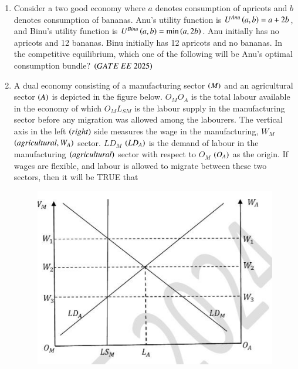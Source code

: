 \documentclass[journal,12pt,onecolumn]{IEEEtran}
\theoremstyle{remark}
\begin{document}
\begin{enumerate}
\begin{enumerate}
\end{enumerate}
\item Consider a two good economy where $a$ denotes consumption of apricots and $b$ denotes consumption of bananas. Anu's utility function is $U^{Anu} \left(a, b\right) = a + 2b$, and Binu's utility function is $U^{Binu} \left(a, b\right) = \min \left(a, 2b\right)$. Anu initially has no apricots and 12 bananas. Binu initially has 12 apricots and no bananas. In the competitive equilibrium, which one of the following will be Anu's optimal consumption bundle?
\hfill $\brak{GATE\ EE\ 2025}$
\begin{enumerate}
\end{enumerate}
\item A dual economy consisting of a manufacturing sector  $\left(M\right)$ and an agricultural sector  $\left(A\right)$ is depicted in the figure below. $O_M O_A$ is the total labour available in the economy of which $O_M L_{SM}$ is the labour supply in the manufacturing sector before any migration was allowed among the labourers. The vertical axis in the left  $\left(right\right)$ side measures the wage in the manufacturing, $W_M$  $\left(agricultural, W_A\right)$ sector. $LD_M$  $\left(LD_A\right)$ is the demand of labour in the manufacturing  $\left(agricultural\right)$ sector with respect to $O_M$  $\left(O_A\right)$ as the origin. If wages are flexible, and labour is allowed to migrate between these two sectors, then it will be TRUE that
\begin{figure}[H]
\includegraphics[scale=0.5]{figs/Q47.jpg}

\end{figure}
\end{enumerate}
\end{document}

